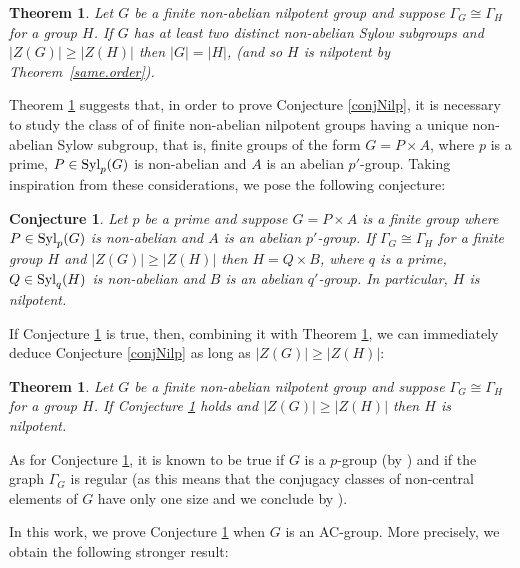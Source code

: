 \documentclass[12pt]{amsart}
\theoremstyle{definition}
\theoremstyle{remark}
\theoremstyle{plain}
\theoremstyle{plain}
\theoremstyle{plain}
\newtheorem{conj}{Conjecture}
\theoremstyle{plain}
\theoremstyle{plain}
\newtheorem{theorem}[definition]{Theorem}
\theoremstyle{remark}
\theoremstyle{remark}
\theoremstyle{definition}
\newcommand{\Syl}{\mathrm{Syl}}
\def \Syl {\hbox {\rm Syl}}
\begin{document}
\begin{theorem}\cite[Theorem 2.4]{non-comm.nilp}\label{nilp.two.sylow}
Let $G$ be a finite non-abelian nilpotent group and suppose $\Gamma_G \cong \Gamma_H$ for a group $H$. If $G$ has at least two distinct non-abelian Sylow subgroups and $|Z(G)| \geq |Z(H)|$ then $|G|=|H|$, (and so $H$ is nilpotent by Theorem~\ref{same.order}).
\end{theorem}

Theorem \ref{nilp.two.sylow} suggests that, in order to prove Conjecture \ref{conjNilp}, it is necessary to study the class of of finite non-abelian nilpotent groups having a unique non-abelian Sylow subgroup, that is, finite groups of the form $G=P \times A$, where $p$ is a prime, $P \in \Syl_p(G)$ is non-abelian and $A$ is an abelian $p'$-group. 
Taking inspiration from these considerations, we pose the following conjecture:

\begin{conj}
\label{conj1}
Let $p$ be a prime and suppose $G=P \times A$ is a finite group where $P \in \Syl_p(G)$ is non-abelian and $A$ is an abelian $p'$-group. If $\Gamma_G \cong \Gamma_H$ for a finite group $H$ and $|Z(G)| \geq |Z(H)|$ then $H=Q \times B$, where $q$ is a prime, $Q \in \Syl_q(H)$ is non-abelian and $B$ is an abelian $q'$-group. In particular, $H$ is nilpotent.
\end{conj}



If Conjecture \ref{conj1} is true, then, combining it with Theorem \ref{nilp.two.sylow}, we can immediately deduce Conjecture \ref{conjNilp} as long as $|Z(G)| \geq |Z(H)|$:

\begin{theorem}\label{3implies2}
Let $G$ be a finite non-abelian nilpotent group and suppose $\Gamma_G \cong \Gamma_H$ for a group $H$. If Conjecture \ref{conj1} holds and $|Z(G)| \geq |Z(H)|$ then $H$ is nilpotent.
\end{theorem}


As for Conjecture \ref{conj1}, it is known to be true if $G$ is a $p$-group (by \cite[Theorem 1.2]{non.comm.p.groups}) and if the graph $\Gamma_G$ is regular (as this means that the conjugacy classes of non-central elements of $G$ have only one size and we conclude by \cite[Theorem 1]{ito}).

In this work, we prove Conjecture \ref{conj1} when $G$ is an AC-group. More precisely, we obtain the following stronger result:
\end{document}
